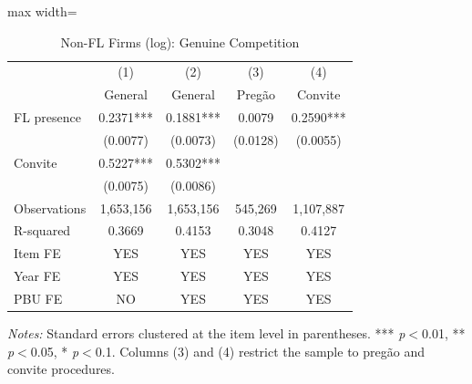 \begin{table}[htbp]
\centering
\caption{Non-FL Firms (log): Genuine Competition}
\label{tab:nfirms_excl}
\begin{adjustbox}{max width=\textwidth}
\begin{threeparttable}
\small
\begin{tabular}{lcccc}
\toprule
 & (1) & (2) & (3) & (4) \\
 & General & General & Preg\~{a}o & Convite \\
\midrule
FL presence & 0.2371*** & 0.1881*** & 0.0079 & 0.2590*** \\
 & (0.0077) & (0.0073) & (0.0128) & (0.0055) \\
Convite & 0.5227*** & 0.5302*** &  &  \\
 & (0.0075) & (0.0086) &  &  \\
\midrule
Observations & 1,653,156 & 1,653,156 & 545,269 & 1,107,887 \\
R-squared & 0.3669 & 0.4153 & 0.3048 & 0.4127 \\
Item FE & YES & YES & YES & YES \\
Year FE & YES & YES & YES & YES \\
PBU FE & NO & YES & YES & YES \\
\bottomrule
\end{tabular}
\begin{tablenotes}
\small
\item \textit{Notes:} Standard errors clustered at the item level in parentheses. *** \textit{p}$<$0.01, ** \textit{p}$<$0.05, * \textit{p}$<$0.1. Columns (3) and (4) restrict the sample to preg\~{a}o and convite procedures.
\end{tablenotes}
\end{threeparttable}
\end{adjustbox}
\end{table}
